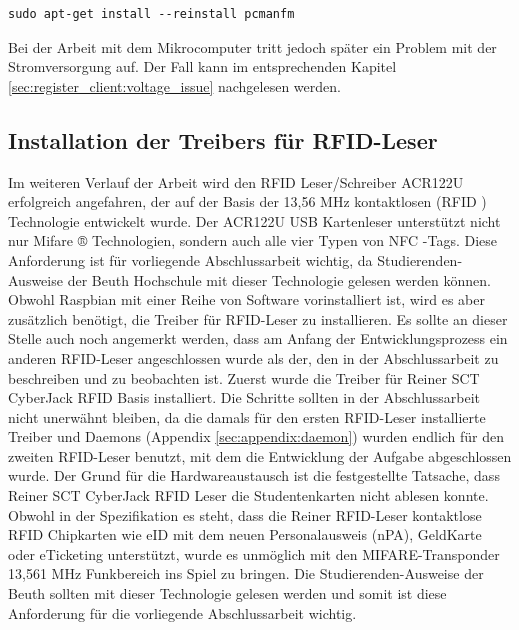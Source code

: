 \begin{lstlisting}[caption={[Boot-Schleife beim Start des der Desktops] },captionpos=b]
sudo apt-get install --reinstall pcmanfm
\end{lstlisting}
Bei der Arbeit mit dem Mikrocomputer tritt jedoch später ein Problem mit der Stromversorgung auf. Der Fall kann im entsprechenden Kapitel \ref{sec:register_client:voltage_issue} nachgelesen werden.


\subsection{Installation der Treibers für RFID-Leser}
\label{sec:register_client:install_rfid}
Im weiteren Verlauf der Arbeit wird den RFID Leser/Schreiber ACR122U erfolgreich angefahren, der auf der Basis der 13,56 MHz kontaktlosen (RFID ) Technologie entwickelt wurde. Der ACR122U USB Kartenleser unterstützt nicht nur Mifare ® Technologien, sondern auch alle vier Typen von NFC -Tags. Diese Anforderung ist für vorliegende Abschlussarbeit wichtig, da Studierenden-Ausweise der Beuth Hochschule mit dieser Technologie gelesen werden können. Obwohl Raspbian mit einer Reihe von Software vorinstalliert ist, wird es aber zusätzlich benötigt, die Treiber für RFID-Leser zu installieren. Es sollte an dieser Stelle auch noch angemerkt werden, dass am Anfang der Entwicklungsprozess ein anderen RFID-Leser angeschlossen wurde als der, den in der Abschlussarbeit zu beschreiben und zu beobachten ist. Zuerst wurde die Treiber für Reiner SCT CyberJack RFID Basis \cite{website:4} installiert. Die Schritte sollten in der Abschlussarbeit nicht unerwähnt bleiben, da die damals für den ersten RFID-Leser installierte Treiber und Daemons (Appendix \ref{sec:appendix:daemon}) wurden endlich für den zweiten RFID-Leser benutzt, mit dem die Entwicklung der Aufgabe abgeschlossen wurde. Der Grund für die Hardwareaustausch ist die festgestellte Tatsache, dass Reiner SCT CyberJack RFID Leser die Studentenkarten nicht ablesen konnte. Obwohl in der Spezifikation es steht, dass die Reiner RFID-Leser kontaktlose RFID Chipkarten wie eID mit dem neuen Personalausweis (nPA), GeldKarte oder eTicketing unterstützt, wurde es unmöglich mit den MIFARE-Transponder 13,561 MHz Funkbereich ins Spiel zu bringen. Die Studierenden-Ausweise der Beuth sollten mit dieser Technologie gelesen werden und somit ist diese Anforderung für die vorliegende Abschlussarbeit wichtig. 

